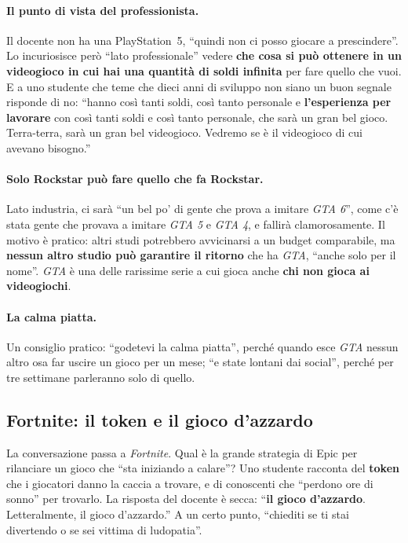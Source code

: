 \paragraph{Il punto di vista del professionista.} Il docente non ha una
PlayStation~5, ``quindi non ci posso giocare a prescindere''. Lo incuriosisce
però ``lato professionale'' vedere \textbf{che cosa si può ottenere in un
videogioco in cui hai una quantità di soldi infinita} per fare quello che vuoi. E
a uno studente che teme che dieci anni di sviluppo non siano un buon segnale
risponde di no: ``hanno così tanti soldi, così tanto personale e
\textbf{l'esperienza per lavorare} con così tanti soldi e così tanto personale,
che sarà un gran bel gioco. Terra-terra, sarà un gran bel videogioco. Vedremo se
è il videogioco di cui avevano bisogno.''

\paragraph{Solo Rockstar può fare quello che fa Rockstar.} Lato industria, ci sarà
``un bel po' di gente che prova a imitare \emph{GTA 6}'', come c'è stata gente che
provava a imitare \emph{GTA 5} e \emph{GTA 4}, e fallirà clamorosamente. Il motivo
è pratico: altri studi potrebbero avvicinarsi a un budget comparabile, ma
\textbf{nessun altro studio può garantire il ritorno} che ha \emph{GTA}, ``anche
solo per il nome''. \emph{GTA} è una delle rarissime serie a cui gioca anche
\textbf{chi non gioca ai videogiochi}.

\paragraph{La calma piatta.} Un consiglio pratico: ``godetevi la calma piatta'',
perché quando esce \emph{GTA} nessun altro osa far uscire un gioco per un mese;
``e state lontani dai social'', perché per tre settimane parleranno solo di
quello.

\subsection{Fortnite: il token e il gioco d'azzardo}

La conversazione passa a \emph{Fortnite}. Qual è la grande strategia di Epic per
rilanciare un gioco che ``sta iniziando a calare''? Uno studente racconta del
\textbf{token} che i giocatori danno la caccia a trovare, e di conoscenti che
``perdono ore di sonno'' per trovarlo. La risposta del docente è secca:
``\textbf{il gioco d'azzardo}. Letteralmente, il gioco d'azzardo.'' A un certo
punto, ``chiediti se ti stai divertendo o se sei vittima di ludopatia''.

